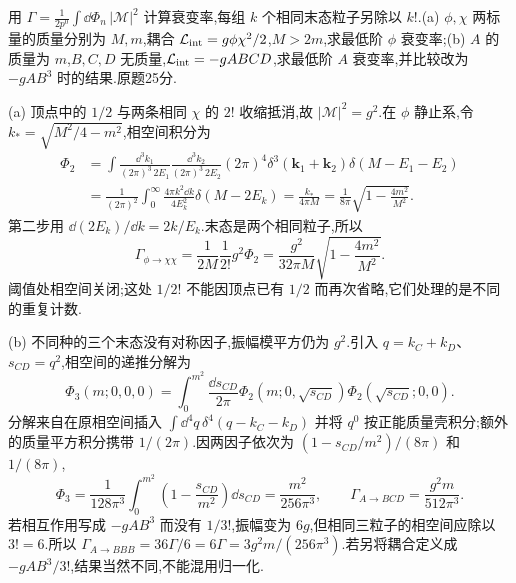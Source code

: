 \begin{exercise}
用 $\Gamma=\frac1{2p^0}\int\dd\Phi_n\,|\mathcal M|^2$ 计算衰变率,每组 $k$ 个相同末态粒子另除以 $k!$.(a) $\phi,\chi$ 两标量的质量分别为 $M,m$,耦合 $\mathcal L_{\rm int}=g\phi\chi^2/2$,$M>2m$,求最低阶 $\phi$ 衰变率;(b) $A$ 的质量为 $m$,$B,C,D$ 无质量,$\mathcal L_{\rm int}=-gABCD$,求最低阶 $A$ 衰变率,并比较改为 $-gAB^3$ 时的结果.原题25分.
\end{exercise}
\begin{solution}
(a) 顶点中的 $1/2$ 与两条相同 $\chi$ 的 $2!$ 收缩抵消,故 $|\mathcal M|^2=g^2$.在 $\phi$ 静止系,令 $k_*=\sqrt{M^2/4-m^2}$,相空间积分为
\begin{align*}
\Phi_2&=\int\frac{\dd^3k_1}{(2\pi)^3\,2E_1}
\frac{\dd^3k_2}{(2\pi)^3\,2E_2}(2\pi)^4
\delta^3(\mathbf k_1+\mathbf k_2)\delta(M-E_1-E_2)\\
&=\frac1{(2\pi)^2}\int_0^\infty
\frac{4\pi k^2\dd k}{4E_k^2}\delta(M-2E_k)
=\frac{k_*}{4\pi M}
=\frac1{8\pi}\sqrt{1-\frac{4m^2}{M^2}}.
\end{align*}
第二步用 $\dd(2E_k)/\dd k=2k/E_k$.末态是两个相同粒子,所以
\[
\Gamma_{\phi\to\chi\chi}
=\frac1{2M}\frac1{2!}g^2\Phi_2
=\frac{g^2}{32\pi M}\sqrt{1-\frac{4m^2}{M^2}}.
\]
阈值处相空间关闭;这处 $1/2!$ 不能因顶点已有 $1/2$ 而再次省略,它们处理的是不同的重复计数.

(b) 不同种的三个末态没有对称因子,振幅模平方仍为 $g^2$.引入 $q=k_C+k_D$、$s_{CD}=q^2$,相空间的递推分解为
\[
\Phi_3(m;0,0,0)=\int_0^{m^2}\frac{\dd s_{CD}}{2\pi}
\Phi_2(m;0,\sqrt{s_{CD}})\Phi_2(\sqrt{s_{CD}};0,0).
\]
分解来自在原相空间插入 $\int\dd^4q\,\delta^4(q-k_C-k_D)$ 并将 $q^0$ 按正能质量壳积分;额外的质量平方积分携带 $1/(2\pi)$.因两因子依次为 $(1-s_{CD}/m^2)/(8\pi)$ 和 $1/(8\pi)$,
\[
\Phi_3=\frac1{128\pi^3}\int_0^{m^2}
\left(1-\frac{s_{CD}}{m^2}\right)\dd s_{CD}
=\frac{m^2}{256\pi^3},
\qquad \Gamma_{A\to BCD}=\frac{g^2m}{512\pi^3}.
\]
若相互作用写成 $-gAB^3$ 而没有 $1/3!$,振幅变为 $6g$,但相同三粒子的相空间应除以 $3!=6$.所以 $\Gamma_{A\to BBB}=36\Gamma/6=6\Gamma=3g^2m/(256\pi^3)$.若另将耦合定义成 $-gAB^3/3!$,结果当然不同,不能混用归一化.
\end{solution}

